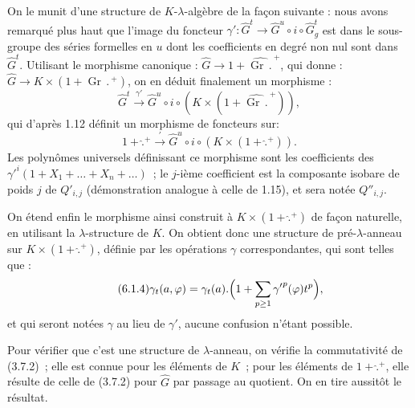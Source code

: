 
On le
munit d'une structure de \(K\)-\(\lambda\)-algèbre de la façon suivante : nous avons remarqué plus haut que l'image du foncteur \(\gamma'\colon\widehat G^t\longrightarrow\widehat G^u\circ i\circ\widehat G^t_g\) est dans le sous-groupe des séries formelles en \(u\) dont les coefficients en degré non nul sont dans \(\widehat G^t\). Utilisant le morphisme canonique : \(\widehat G\longrightarrow 1+\widehat{\operatorname{Gr}\,\mathord{.}\,}^{+}\), qui donne : \(\widehat G\longrightarrow K\times(1+\operatorname{Gr}\,\mathord{.}\,{}^{+})\), on en déduit finalement un morphisme :
\[
  \widehat G^t\xrightarrow{\gamma'}\widehat G^u\circ i\circ(K\times(1+\widehat{\operatorname{Gr}\,\mathord{.}\,}^{+})),
\]
qui d'après 1.12 définit un morphisme de foncteurs sur\qquad:
\[
  1+\widehat{\mathord{.}}{}^{+}\xrightarrow{'}\widehat G^u\circ i\circ(K\times(1+\widehat{\mathord{.}}{}^{+})).
\]
Les polynômes universels définissant ce morphisme sont les coefficients des \({\gamma'}^{i}(1+X_1+\ldots+X_n+\ldots)\)~; le \(j\)-ième coefficient est la composante isobare de poids \(j\) de \(Q'_{i,j}\) (démonstration analogue à celle de 1.15), et sera notée \(Q''_{i,j}\).

On étend enfin le morphisme ainsi construit à \(K\times(1+\widehat{\mathord{.}}{}^{+})\) de façon naturelle, en utilisant la \(\lambda\)-structure de \(K\). On obtient donc une structure de pré-\(\lambda\)-anneau sur \(K\times(1+\widehat{\mathord{.}}{}^{+})\), définie par les opérations \(\gamma\) correspondantes, qui sont telles que :
\begin{equation}\tag{6.1.4}
  \gamma_t(a,\varphi)=\gamma_t(a).\Bigl(1+\sum_{p\ge1}{\gamma'}^{p}(\varphi)t^{p}\Bigr),
\end{equation}
et qui seront notées \(\gamma\) au lieu de \(\gamma'\), aucune confusion n'étant possible.

Pour vérifier que c'est une structure de \(\lambda\)-anneau, on vérifie la commutativité de (3.7.2)~; elle est connue pour les éléments de \(K\)~; pour les éléments de \(1+\widehat{\mathord{.}}{}^{+}\), elle résulte de celle de (3.7.2) pour \(\widehat G\) par passage au quotient. On en tire aussitôt le résultat.



\providecommand{\Ghat}{\widehat G}
\providecommand{\Aqhat}{\widehat A_{\mathbb Q}}
\providecommand{\Ch}{\operatorname{Ch}}
\providecommand{\Log}{\operatorname{Log}}
\renewcommand{\id}{\operatorname{id}}
\providecommand{\gr}{\operatorname{gr}}
\providecommand{\Hom}{\operatorname{Hom}}
\providecommand{\epsi}{\varepsilon}
\providecommand{\clgr}{\operatorname{cl}}
\providecommand{\Fil}{\operatorname{Fil}}
\providecommand{\Gr}{\operatorname{Gr}}
\providecommand{\Sym}{\operatorname{Sym}}


